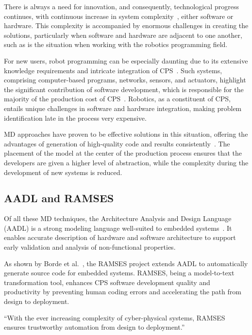 There is always a need for innovation, and consequently, technological progress continues, with continuous increase in system complexity~\cite{lee2008}, either software or hardware. This complexity is accompanied by enormous challenges in creating the solutions, particularly when software and hardware are adjacent to one another, such as is the situation when working with the robotics programming field. 
\par
For new users, robot programming can be especially daunting due to its extensive knowledge requirements and intricate integration of \gls{CPS}~\cite{Khatib_Siciliano_2016}. Such systems, comprising computer-based programs, networks, sensors, and actuators, highlight the significant contribution of software development, which is responsible for the majority of the production cost of \gls{CPS}~\cite{Rajkumar_Ragunathan_Lee_2010}. Robotics, as a constituent of \gls{CPS}, entails unique challenges in software and hardware integration, making problem identification late in the process very expensive.
\par
\gls{MD} approaches have proven to be effective solutions in this situation, offering the advantages of generation of high-quality code and results consistently~\cite{Schmidt_DC_2006}. The placement of the model at the center of the production process ensures that the developers are given a higher level of abstraction, while the complexity during the development of new systems is reduced.

\subsection{AADL and RAMSES}

Of all these \gls{MD} techniques, the Architecture Analysis and Design Language (AADL) is a strong modeling language well-suited to embedded systems~\cite{Feiler_Lewis_Vestal_2006}. It enables accurate description of hardware and software architecture to support early validation and analysis of non-functional properties.
\par
As shown by Borde et al.~\cite{Borde_Rahmoun_Cadoret_Pautet_Singhoff_Dissaux_2014}, the \gls{RAMSES} project extends AADL to automatically generate source code for embedded systems. \gls{RAMSES}, being a model-to-text transformation tool, enhances \gls{CPS} software development quality and productivity by preventing human coding errors and accelerating the path from design to deployment.

\begin{tcolorbox}[colback=green!8]
	“With the ever increasing complexity of cyber-physical systems, \gls{RAMSES} ensures trustworthy automation from design to deployment.”
\end{tcolorbox}

